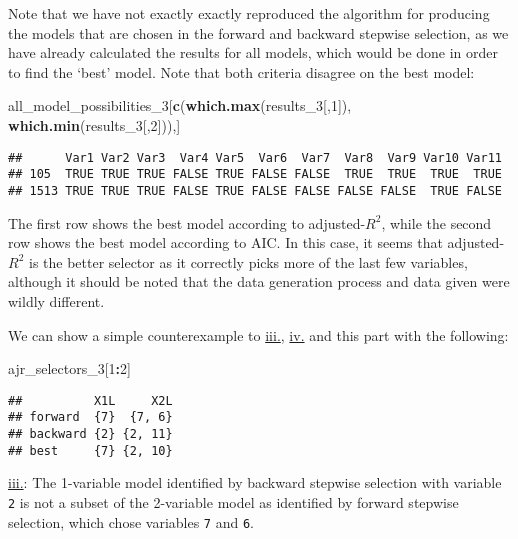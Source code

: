 \documentclass[
]{article}
\newenvironment{Shaded}{\begin{snugshade}}{\end{snugshade}}
\newcommand{\DecValTok}[1]{\textcolor[rgb]{0.00,0.00,0.81}{#1}}
\newcommand{\KeywordTok}[1]{\textcolor[rgb]{0.13,0.29,0.53}{\textbf{#1}}}
\newcommand{\NormalTok}[1]{#1}
\newcommand{\OperatorTok}[1]{\textcolor[rgb]{0.81,0.36,0.00}{\textbf{#1}}}
\begin{document}
Note that we have not exactly exactly reproduced the algorithm for
producing the models that are chosen in the forward and backward
stepwise selection, as we have already calculated the results for all
models, which would be done in order to find the `best' model. Note that
both criteria disagree on the best model:

\begin{Shaded}
\begin{Highlighting}[]
\NormalTok{all_model_possibilities_}\DecValTok{3}\NormalTok{[}\KeywordTok{c}\NormalTok{(}\KeywordTok{which.max}\NormalTok{(results_}\DecValTok{3}\NormalTok{[,}\DecValTok{1}\NormalTok{]),}
                            \KeywordTok{which.min}\NormalTok{(results_}\DecValTok{3}\NormalTok{[,}\DecValTok{2}\NormalTok{])),]}
\end{Highlighting}
\end{Shaded}

\begin{verbatim}
##      Var1 Var2 Var3  Var4 Var5  Var6  Var7  Var8  Var9 Var10 Var11
## 105  TRUE TRUE TRUE FALSE TRUE FALSE FALSE  TRUE  TRUE  TRUE  TRUE
## 1513 TRUE TRUE TRUE FALSE TRUE FALSE FALSE FALSE FALSE  TRUE FALSE
\end{verbatim}

The first row shows the best model according to adjusted-\(R^{2}\),
while the second row shows the best model according to AIC. In this
case, it seems that adjusted-\(R^{2}\) is the better selector as it
correctly picks more of the last few variables, although it should be
noted that the data generation process and data given were wildly
different.

We can show a simple counterexample to
\protect\hyperlink{threeciii}{iii.}, \protect\hyperlink{threeciv}{iv.}
and this part with the following:

\begin{Shaded}
\begin{Highlighting}[]
\NormalTok{ajr_selectors_}\DecValTok{3}\NormalTok{[}\DecValTok{1}\OperatorTok{:}\DecValTok{2}\NormalTok{]}
\end{Highlighting}
\end{Shaded}

\begin{verbatim}
##          X1L     X2L
## forward  {7}  {7, 6}
## backward {2} {2, 11}
## best     {7} {2, 10}
\end{verbatim}

\protect\hyperlink{threeciii}{iii.}: The 1-variable model identified by
backward stepwise selection with variable \texttt{2} is not a subset of
the 2-variable model as identified by forward stepwise selection, which
chose variables \texttt{7} and \texttt{6}.
\end{document}
